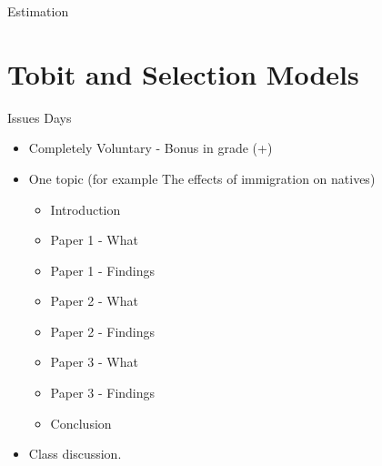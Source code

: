 \documentclass{beamer}
\newcommand{\1}{\mathbb{1}}
\begin{document}
\begin{frame}{Estimation}

\end{frame}

\section{Tobit and Selection Models}

\begin{frame}
\tableofcontents[currentsection] 
\end{frame}


\begin{frame}{Issues Days}
\begin{itemize}
\item Completely Voluntary - Bonus in grade (+)
\item One topic (for example The effects of immigration on natives)
\begin{itemize}
\item Introduction 
\item Paper 1 - What
\item Paper 1 - Findings 
\item Paper 2 - What 
\item Paper 2 - Findings
\item Paper 3 - What
\item Paper 3 - Findings
\item Conclusion
\end{itemize}
\item Class discussion.
\end{itemize}
\end{frame}
\end{document}
